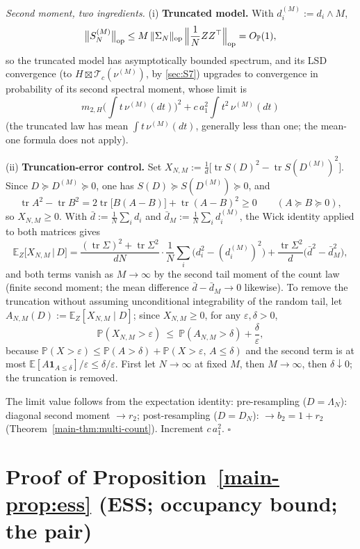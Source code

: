 \emph{Second moment, two ingredients.} (i) \textbf{Truncated model.} With $d_i^{(M)}:=d_i\wedge M$,
\[
\big\|S_N^{(M)}\big\|_{\rm op}\le M\,\|\Sigma_N\|_{\rm op}\,\Big\|\frac1NZZ^\top\Big\|_{\rm op}=O_{\mathbb P}(1),
\]
so the truncated model has asymptotically bounded spectrum, and its LSD convergence (to $H\boxtimes\mathcal T_c(\nu^{(M)})$, by \ref{sec:S7}) upgrades to convergence in probability of its second spectral moment, whose limit is
\[
m_{2,H}\Big(\int t\,\nu^{(M)}(dt)\Big)^2+c\,a_1^2\int t^2\,\nu^{(M)}(dt)
\]
(the truncated law has mean $\int t\,\nu^{(M)}(dt)$, generally less than one; the mean-one formula does not apply).

(ii) \textbf{Truncation-error control.} Set $X_{N,M}:=\frac1d\big[\operatorname{tr}S(D)^2-\operatorname{tr}S(D^{(M)})^2\big]$. Since $D\succeq D^{(M)}\succeq0$, one has $S(D)\succeq S(D^{(M)})\succeq0$, and
\[
\operatorname{tr}A^2-\operatorname{tr}B^2=2\operatorname{tr}\big[B(A-B)\big]+\operatorname{tr}(A-B)^2\ge0\qquad(A\succeq B\succeq0),
\]
so $X_{N,M}\ge0$. With $\bar d:=\frac1N\sum_id_i$ and $\bar d_M:=\frac1N\sum_id_i^{(M)}$, the Wick identity applied to both matrices gives
\[
\mathbb E_Z\big[X_{N,M}\,\big|\,D\big]=\frac{(\operatorname{tr}\Sigma)^2+\operatorname{tr}\Sigma^2}{dN}\cdot\frac1N\sum_i\big(d_i^2-(d_i^{(M)})^2\big)+\frac{\operatorname{tr}\Sigma^2}{d}\big(\bar d^2-\bar d_M^2\big),
\]
and both terms vanish as $M\to\infty$ by the second tail moment of the count law (finite second moment; the mean difference $\bar d-\bar d_M\to0$ likewise). To remove the truncation without assuming unconditional integrability of the random tail, let $A_{N,M}(D):=\mathbb E_Z[X_{N,M}\mid D]$; since $X_{N,M}\ge0$, for any $\varepsilon,\delta>0$,
\[
\mathbb P(X_{N,M}>\varepsilon)\ \le\ \mathbb P(A_{N,M}>\delta)+\frac{\delta}{\varepsilon},
\]
because $\mathbb P(X>\varepsilon)\le\mathbb P(A>\delta)+\mathbb P(X>\varepsilon,\,A\le\delta)$ and the second term is at most $\mathbb E[A\mathbf 1_{A\le\delta}]/\varepsilon\le\delta/\varepsilon$. First let $N\to\infty$ at fixed $M$, then $M\to\infty$, then $\delta\downarrow0$; the truncation is removed.

The limit value follows from the expectation identity: pre-resampling ($D=\Lambda_N$): diagonal second moment $\to r_2$; post-resampling ($D=D_N$): $\to b_2=1+r_2$ (Theorem~\ref{main-thm:multi-count}). Increment $c\,a_1^2$. $\square$

\section{Proof of Proposition~\ref{main-prop:ess} (ESS; occupancy bound; the pair)}\label{sec:S10}

